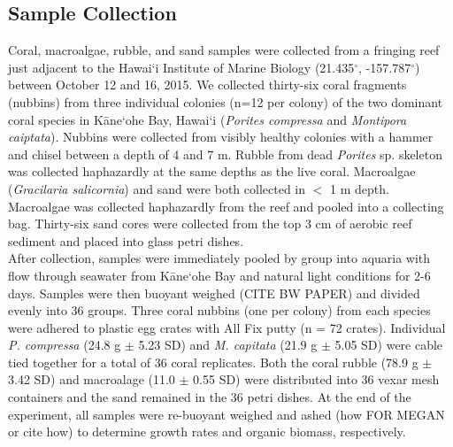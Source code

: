 \documentclass{article}%
\begin{document}
\subsection{Sample Collection}
 Coral, macroalgae, rubble, and sand samples were collected from a fringing reef just adjacent to the Hawai`i Institute of Marine Biology (21.435$^{\circ}$, -157.787$^{\circ}$) between October 12 and 16, 2015. We collected thirty-six coral fragments (nubbins) from three individual colonies (n=12 per colony) of the two dominant coral species in  K\={a}ne`ohe Bay, Hawai`i (\textit{Porites compressa} and \textit{Montipora caiptata}). Nubbins were collected from visibly healthy colonies with a hammer and chisel between a depth of 4 and 7 m. Rubble from dead \textit{Porites} sp. skeleton was collected haphazardly at the same depths as the live coral. Macroalgae (\textit{Gracilaria salicornia}) and sand were both collected in $<$ 1 m depth. Macroalgae was collected haphazardly from the reef and pooled into a collecting bag. Thirty-six sand cores were collected from the top 3 cm of aerobic reef sediment and placed into glass petri dishes. \\
\indent After collection, samples were immediately pooled by group into aquaria with flow through seawater from K\={a}ne`ohe Bay and natural light conditions for 2-6 days. Samples were then buoyant weighed (CITE BW PAPER) and divided evenly into 36 groups. Three coral nubbins (one per colony) from each species were adhered to plastic egg crates with All Fix putty (n = 72 crates). Individual \textit{P. compressa} (24.8 g $\pm$ 5.23 SD) and \textit{M. capitata} (21.9 g $\pm$ 5.05 SD) were cable tied together for a total of 36 coral replicates. Both the coral rubble (78.9 g $\pm$ 3.42 SD) and macroalage (11.0 $\pm$ 0.55 SD) were distributed into 36 vexar mesh containers and the sand remained in the 36 petri dishes. At the end of the experiment, all samples were re-buoyant weighed and ashed (how FOR MEGAN or cite how) to determine growth rates and organic biomass, respectively.
 
\end{document}
